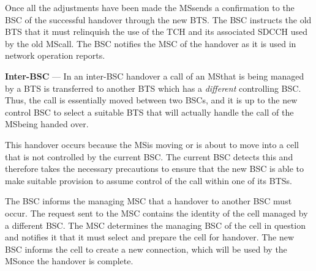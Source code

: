 \begin{description}
Once all the adjustments have been made the \gls{MS}sends a confirmation to the BSC of the successful handover through the new BTS\@. The BSC instructs the old BTS that it must relinquish the use of the TCH and its associated SDCCH used by the old \gls{MS}call. The BSC notifies the MSC of the handover as it is used in network operation reports\cite{wirelesstelcoMullet,GSMArchitectureProtocolsServices}.
\item{\textbf{Inter-BSC}} --- In an inter-BSC handover a call of an \gls{MS}that is being managed by a BTS is transferred to another BTS which has a \emph{different} controlling BSC\@. Thus, the call is essentially moved between two BSCs, and it is up to the new control BSC to select a suitable BTS that will actually handle the call of the \gls{MS}being handed over\cite{wirelesstelcoMullet,GSMArchitectureProtocolsServices}.

This handover occurs because the \gls{MS}is moving or is about to move into a cell that is not controlled by the current BSC\@. The current BSC detects this and therefore takes the necessary precautions to ensure that the new BSC is able to make suitable provision to assume control of the call within one of its BTSs\cite{wirelesstelcoMullet,GSMArchitectureProtocolsServices}.

The BSC informs the managing MSC that a handover to another BSC must occur. The request sent to the MSC contains the identity of the cell managed by a different BSC\@. The MSC determines the managing BSC of the cell in question and notifies it that it must select and prepare the cell for handover. The new BSC informs the cell to create a new connection, which will be used by the \gls{MS}once the handover is complete\cite{wirelesstelcoMullet,GSMArchitectureProtocolsServices}.


\end{description}
